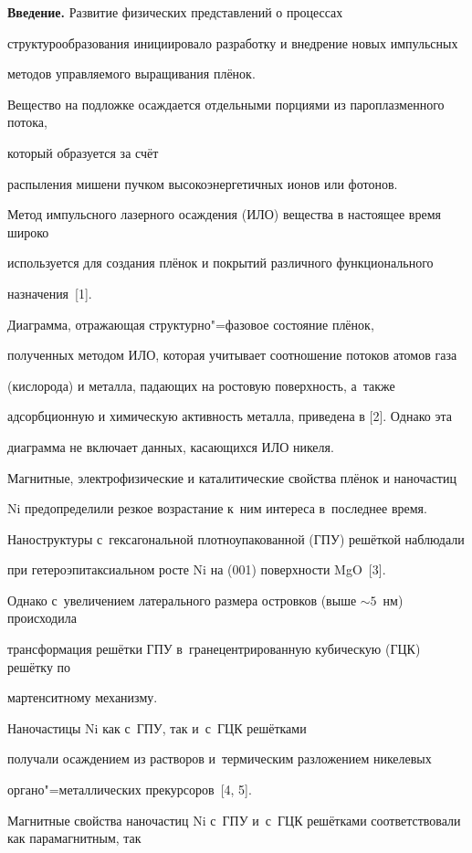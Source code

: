 \textbf{Введение.} Развитие физических представлений о процессах

структурообразования инициировало разработку и внедрение новых импульсных

методов управляемого выращивания плёнок.

Вещество на подложке осаждается отдельными порциями из пароплазменного потока,

который образуется за счёт

распыления мишени пучком высокоэнергетичных ионов или фотонов.

Метод импульсного лазерного осаждения (ИЛО) вещества в настоящее время широко

используется для создания плёнок и покрытий различного функционального

назначения~[1].

Диаграмма, отражающая структурно"=фазовое состояние плёнок,

полученных методом ИЛО, которая учитывает соотношение потоков атомов газа

(кислорода) и металла, падающих на ростовую поверхность, а~также

адсорбционную и химическую активность металла, приведена в [2]. Однако эта

диаграмма не включает данных, касающихся ИЛО никеля.



Магнитные, электрофизические и каталитические свойства плёнок и наночастиц

Ni предопределили резкое возрастание к~ним интереса в~последнее время.

Наноструктуры с~гексагональной плотноупакованной (ГПУ) решёткой наблюдали

при гетероэпитаксиальном росте Ni на (001) поверхности MgO~[3].

Однако с~увеличением латерального размера островков (выше $\sim 5$~нм) происходила

трансформация решётки ГПУ в~гранецентрированную кубическую (ГЦК) решётку по

мартенситному механизму.

Наночастицы Ni как с~ГПУ, так и~с~ГЦК решётками

получали осаждением из растворов и~термическим разложением никелевых

органо"=металлических прекурсоров~[4, 5].

Магнитные свойства наночастиц Ni с~ГПУ и~с~ГЦК решётками соответствовали как парамагнитным, так

